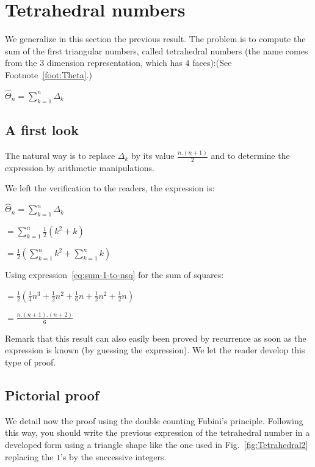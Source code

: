 \section{Tetrahedral numbers}
\label{sec:tetraedralNumbers}

We generalize in this section the previous result. The problem is to compute
the sum of the first triangular numbers, called tetrahedral numbers (the name comes from the 3 dimension representation, 
which has $4$ faces):(See Footnote~\ref{foot:Theta}.)

$\widehat{\Theta}_n =  \sum_{k=1}^{n} \Delta_k$

\subsection{A first look}

The natural way is to replace $\Delta_k$ by its value $\frac{n.(n+1)}{2}$ and to determine the expression
by arithmetic manipulations.

We left the verification to the readers, the expression is:

$\widehat{\Theta}_n =  \sum_{k=1}^{n} \Delta_k $

$=  \sum_{k=1}^{n} \frac{1}{2} (k^2 + k) $

$=  \frac{1}{2} (\sum_{k=1}^{n} k^2 + \sum_{k=1}^{n} k) $

Using expression~\ref{eq:sum-1-to-nsq} for the sum of squares:

$= \frac{1}{2} ( \frac{1}{3} n^3 + \frac{1}{2} n^2 + \frac{1}{6} n + \frac{1}{2} n^2 + \frac{1}{2} n )$

$= \frac{n.(n+1).(n+2)}{6}$

\medskip

Remark that this result can also easily been proved by recurrence as soon as the expression is known
(by guessing the expression).
We let the reader develop this type of proof. 


\subsection{Pictorial proof}

We detail now the proof using the double counting Fubini's principle.
Following this way, you should write the previous expression of the tetrahedral number in a developed form 
using a triangle shape like the one used in Fig.~\ref{fig:Tetrahedral2}
replacing the $1$'s by the successive integers.

